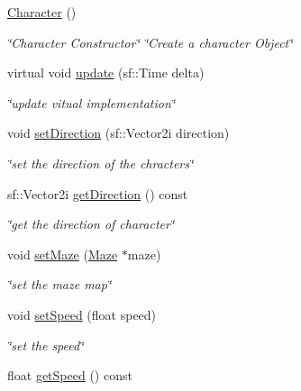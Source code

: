 \begin{DoxyCompactItemize}
\item 
\mbox{\label{classCharacter_adc27bdd255876169bad2ed0bae0cffb5}} 
\hyperlink{classCharacter_adc27bdd255876169bad2ed0bae0cffb5}{Character} ()
\begin{DoxyCompactList}\small\item\em \char`\"{}\+Character Constructor\char`\"{}  \char`\"{}\+Create a character Object\char`\"{} \end{DoxyCompactList}\item 
virtual void \hyperlink{classCharacter_a9d20989cb4d1c826f98f9d6f7c9f63a6}{update} (sf\+::\+Time delta)
\begin{DoxyCompactList}\small\item\em \char`\"{}update vitual implementation\char`\"{} \end{DoxyCompactList}\item 
void \hyperlink{classCharacter_aa7ac14465f088f97e955be6a352a5e34}{set\+Direction} (sf\+::\+Vector2i direction)
\begin{DoxyCompactList}\small\item\em \char`\"{}set the direction of the chracters\char`\"{} \end{DoxyCompactList}\item 
sf\+::\+Vector2i \hyperlink{classCharacter_ae8147e847ec305534ef4f2652f3541de}{get\+Direction} () const
\begin{DoxyCompactList}\small\item\em \char`\"{}get the direction of character\char`\"{} \end{DoxyCompactList}\item 
void \hyperlink{classCharacter_aba54445fcae47eff401d4c226675d9b4}{set\+Maze} (\hyperlink{classMaze}{Maze} $\ast$maze)
\begin{DoxyCompactList}\small\item\em \char`\"{}set the maze map\char`\"{} \end{DoxyCompactList}\item 
void \hyperlink{classCharacter_a0569c1aa9c37e7436083c0f301a205be}{set\+Speed} (float speed)
\begin{DoxyCompactList}\small\item\em \char`\"{}set the speed\char`\"{} \end{DoxyCompactList}\item 
float \hyperlink{classCharacter_afb7791a8c122e8b88244f0a1a54506c0}{get\+Speed} () const

\end{DoxyCompactItemize}
